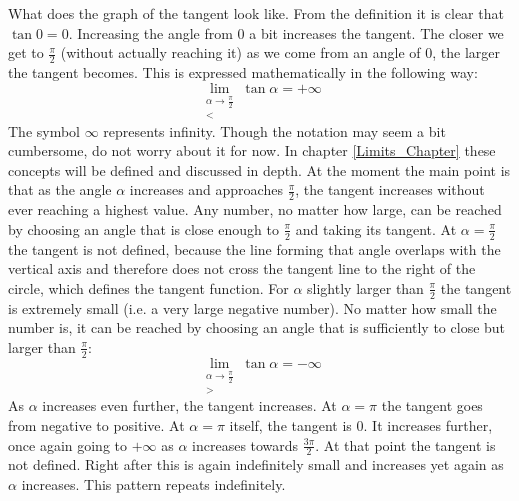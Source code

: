 \noindent What does the graph of the tangent look like. From the definition it is clear that $\tan 0 = 0$. Increasing the angle from $0$ a bit increases the tangent. The closer we get to $\frac{\pi}{2}$ (without actually reaching it) as we come from an angle of $0$, the larger the tangent becomes. This is expressed mathematically in the following way: 
$$
\lim_{\substack{\alpha\rightarrow \frac{\pi}{2}\\<}} \tan \alpha = + \infty
$$ 
\noindent The symbol $\infty$ represents infinity. Though the notation may seem a bit cumbersome, do not worry about it for now. In chapter \ref{Limits_Chapter} these concepts will be defined and discussed in depth. At the moment the main point is that as the angle $\alpha$ increases and approaches $\frac{\pi}{2}$, the tangent increases without ever reaching a highest value. Any number, no matter how large, can be reached by choosing an angle that is close enough to $\frac{\pi}{2}$ and taking its tangent. At $\alpha=\frac{\pi}{2}$ the tangent is not defined, because the line forming that angle overlaps with the vertical axis and therefore does not cross the tangent line to the right of the circle, which defines the tangent function. For $\alpha$ slightly larger than $\frac{\pi}{2}$ the tangent is extremely small (i.e. a very large negative number). No matter how small the number is, it can be reached by choosing an angle that is sufficiently to close but larger than $\frac{\pi}{2}$:
$$
\lim_{\substack{\alpha\rightarrow \frac{\pi}{2}\\>}} \tan \alpha = - \infty
$$
\noindent As $\alpha$ increases even further, the tangent increases. At $\alpha = \pi$ the tangent goes from negative to positive. At $\alpha=\pi$ itself, the tangent is $0$. It increases further, once again going to $+ \infty$ as $\alpha$ increases towards $\frac{3 \pi}{2}$. At that point the tangent is not defined. Right after this is again indefinitely small and increases yet again as $\alpha$ increases. This pattern repeats indefinitely.\\

